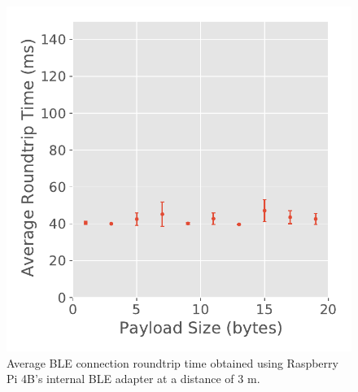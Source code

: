 \begin{figure}[H]
\begin{minipage}{0.45\linewidth}
    \end{minipage}
    \hspace{0.05\linewidth}
    \begin{minipage}{0.45\linewidth}
        \centering
        \includegraphics[width=\linewidth]{images/ble-roundtrip-hci1-300cm.pdf}
        \caption[Average \acs{BLE} connection roundtrip time obtained using the Raspberry Pi 4B's internal \acs{BLE} adapter at a distance of 3 m.]{Average \acs{BLE} connection roundtrip time obtained using Raspberry Pi 4B's internal \acs{BLE} adapter at a distance of $3\text{ m}$.}
        \label{fig:ble-roundtrip-hci1-3m}
    \end{minipage}
\end{figure}

